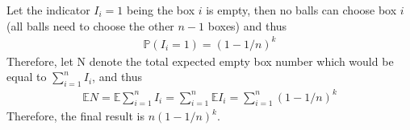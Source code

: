 
\setcounter{theorem}{33}
\begin{exercise} [BH.4.34]
\begin{solution}
    Let the indicator $I_i=1$ being the box $i$ is empty, then no balls can choose box $i$ (all balls need to choose the other $n-1$ boxes) and thus 
	\begin{align*}
		\mathbb{P}(I_i=1) = (1-1/n)^k
	\end{align*}
	Therefore, let N denote the total expected empty box number which would be equal to $\sum_{i=1}^n I_i$, and thus   
	\begin{align*}
		\mathbb{E}N=\mathbb{E} \sum_{i=1}^n I_i =\sum_{i=1}^n \mathbb{E} I_i=\sum_{i=1}^n   (1-1/n)^k
	\end{align*}
	Therefore, the final result is 
	$ n(1-1/n)^k$.
\end{solution}
\end{exercise}

